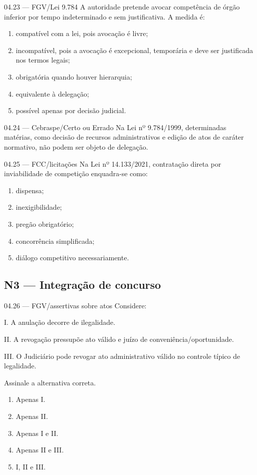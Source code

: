\begin{questao}{ 04.23 — FGV/Lei 9.784}
A autoridade pretende avocar competência de órgão inferior por tempo indeterminado e sem justificativa. A medida é:
\begin{enumerate}[label=\Alph*)]
\item compatível com a lei, pois avocação é livre;
\item incompatível, pois a avocação é excepcional, temporária e deve ser justificada nos termos legais;
\item obrigatória quando houver hierarquia;
\item equivalente à delegação;
\item possível apenas por decisão judicial.
\end{enumerate}
\end{questao}

\begin{questao}{ 04.24 — Cebraspe/Certo ou Errado}
Na Lei nº 9.784/1999, determinadas matérias, como decisão de recursos administrativos e edição de atos de caráter normativo, não podem ser objeto de delegação.
\end{questao}

\begin{questao}{ 04.25 — FCC/licitações}
Na Lei nº 14.133/2021, contratação direta por inviabilidade de competição enquadra-se como:
\begin{enumerate}[label=\Alph*)]
\item dispensa;
\item inexigibilidade;
\item pregão obrigatório;
\item concorrência simplificada;
\item diálogo competitivo necessariamente.
\end{enumerate}
\end{questao}

\subsection*{N3 — Integração de concurso}

\begin{questao}{ 04.26 — FGV/assertivas sobre atos}
Considere:

I. A anulação decorre de ilegalidade.

II. A revogação pressupõe ato válido e juízo de conveniência/oportunidade.

III. O Judiciário pode revogar ato administrativo válido no controle típico de legalidade.

Assinale a alternativa correta.
\begin{enumerate}[label=\Alph*)]
\item Apenas I.
\item Apenas II.
\item Apenas I e II.
\item Apenas II e III.
\item I, II e III.
\end{enumerate}
\end{questao}

